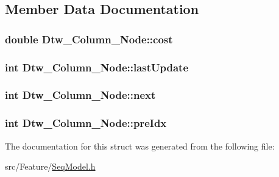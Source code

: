\subsection{Member Data Documentation}
\hypertarget{struct_dtw___column___node_a4da0707e24783e6dac4af2df75089ad8}{
\subsubsection[{cost}]{\setlength{\rightskip}{0pt plus 5cm}double Dtw\+\_\+\+Column\+\_\+\+Node\+::cost}}\label{struct_dtw___column___node_a4da0707e24783e6dac4af2df75089ad8}
\hypertarget{struct_dtw___column___node_a820a6ed2870d932e2f371bc66bb9ba84}{
\subsubsection[{last\+Update}]{\setlength{\rightskip}{0pt plus 5cm}int Dtw\+\_\+\+Column\+\_\+\+Node\+::last\+Update}}\label{struct_dtw___column___node_a820a6ed2870d932e2f371bc66bb9ba84}
\hypertarget{struct_dtw___column___node_affe8cf80f0a27940aea2ed5e2cf5b7a0}{
\subsubsection[{next}]{\setlength{\rightskip}{0pt plus 5cm}int Dtw\+\_\+\+Column\+\_\+\+Node\+::next}}\label{struct_dtw___column___node_affe8cf80f0a27940aea2ed5e2cf5b7a0}
\hypertarget{struct_dtw___column___node_ae39557fcb83f68ccb31dce3d265c17e0}{
\subsubsection[{pre\+Idx}]{\setlength{\rightskip}{0pt plus 5cm}int Dtw\+\_\+\+Column\+\_\+\+Node\+::pre\+Idx}}\label{struct_dtw___column___node_ae39557fcb83f68ccb31dce3d265c17e0}


The documentation for this struct was generated from the following file\+:\begin{DoxyCompactItemize}
\item 
src/\+Feature/\hyperlink{_seq_model_8h}{Seq\+Model.\+h}\end{DoxyCompactItemize}
